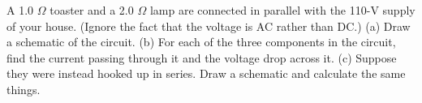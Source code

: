         A 1.0 $\Omega$ toaster and a 2.0 $\Omega$ lamp are connected in
        parallel with the 110-V supply of your house. (Ignore the
        fact that the voltage is AC rather than DC.) \hwendpart
        (a) Draw a
        schematic of the circuit.  \hwendpart
        (b)  For each of the three
        components in the circuit, find the current passing through
        it and the voltage drop across it. \answercheck\hwendpart
        (c) Suppose they were
        instead hooked up in series.  Draw a schematic and
        calculate the same things.\answercheck
